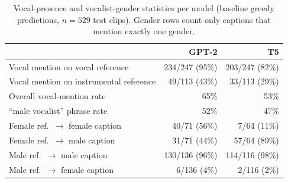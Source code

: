 \begin{table}[ht]
\centering
\caption{Vocal-presence and vocalist-gender statistics per model (baseline greedy predictions, $n=529$ test clips). Gender rows count only captions that mention exactly one gender.}
\label{tab:vocal_bias}
\footnotesize
\begin{tabular}{lrr}
\toprule
 & GPT-2 & T5 \\
\midrule
Vocal mention on vocal reference & 234/247 (95\%) & 203/247 (82\%) \\
Vocal mention on instrumental reference & 49/113 (43\%) & 33/113 (29\%) \\
Overall vocal-mention rate & 65\% & 53\% \\
``male vocalist'' phrase rate & 52\% & 47\% \\
Female ref.\ $\rightarrow$ female caption & 40/71 (56\%) & 7/64 (11\%) \\
Female ref.\ $\rightarrow$ male caption & 31/71 (44\%) & 57/64 (89\%) \\
Male ref.\ $\rightarrow$ male caption & 130/136 (96\%) & 114/116 (98\%) \\
Male ref.\ $\rightarrow$ female caption & 6/136 (4\%) & 2/116 (2\%) \\
\bottomrule
\end{tabular}
\end{table}
